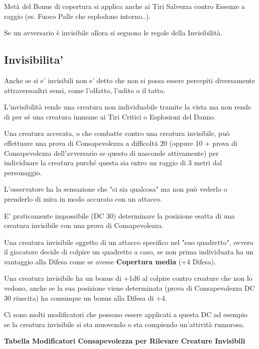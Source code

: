 \documentclass[a4paper,11pt,twoside,openany]{book}
\begin{document}
Metà del Bonus di copertura si applica anche ai Tiri Salvezza contro Essenze a raggio (es. Fuoco Palle che esplodono intorno..).

Se un avversario è invisibile allora si seguono le regole della Invisibilità.

\subsection{Invisibilita'}

\label{invisibilita}

Anche se si e' invisibili non e' detto che non si possa essere percepiti diversamente attraversoaltri sensi, come l'olfatto, l'udito o il tatto.

L'invisibilità rende una creatura non individuabile tramite la vista ma non rende di per sé una creatura immune ai Tiri Critici o Esplosioni del Danno.

Una creatura accecata, o che combatte contro una creatura invisibile, può effettuare una prova di Consapevolezza a difficoltà 20 (oppure 10 + prova di Consapevolezza dell'avversario se questo di nasconde attivamente) per individuare la creatura purché questa sia entro un raggio di 3 metri dal personaggio.

L'osservatore ha la sensazione che "ci sia qualcosa" ma non può vederlo o prenderlo di mira in modo accurato con un attacco.

E' praticamente impossibile (DC 30) determinare la posizione esatta di una creatura invisibile con una prova di Consapevolezza.

Una creatura invisibile oggetto di un attacco specifico nel "suo quadretto", ovvero il giocatore decide di colpire un quadretto a caso, se non prima individuata ha un vantaggio alla Difesa come se avesse \textbf{Copertura media} (+4 Difesa).

Una creatura invisibile ha un bonus di +1d6 al colpire contro creature che non lo vedono, anche se la sua posizione viene determinata (prova di Consapevolezza DC 30 riuscita) ha comunque un bonus alla Difesa di +4.

Ci sono molti modificatori che possono essere applicati a questa DC ad esempio se la creatura invisibile si sta muovendo o sta compiendo un'attività rumorosa.

\bigskip

\textbf{Tabella Modificatori Consapevolezza per Rilevare Creature Invisibili}

\medskip
\end{document}

